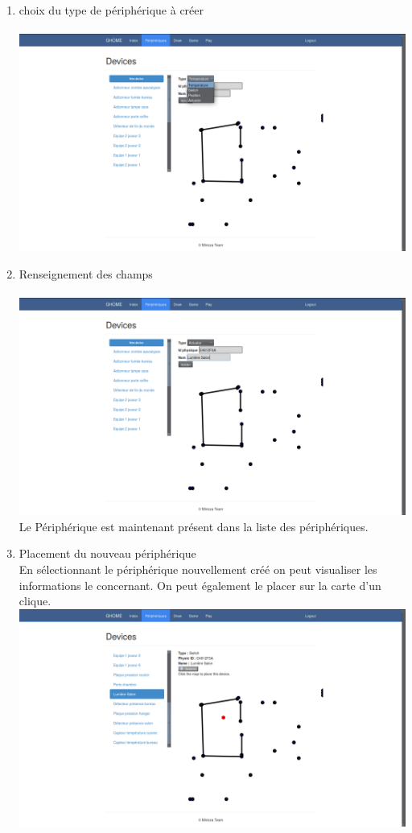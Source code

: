\begin{enumerate}
\item choix du type de périphérique à créer\\
~~\\
\includegraphics[scale=0.25]{image/periphChoice.png}\\
\item Renseignement des champs \\
~~\\
\includegraphics[scale=0.25]{image/formPeriph.png}\\
Le Périphérique est maintenant présent dans la liste des périphériques.
\item Placement du nouveau périphérique\\
En sélectionnant le périphérique nouvellement créé on peut visualiser les informations le concernant. On peut également le placer sur la carte d'un clique.\\
\includegraphics[scale=0.25]{image/placePeriph.png}
\end{enumerate}
